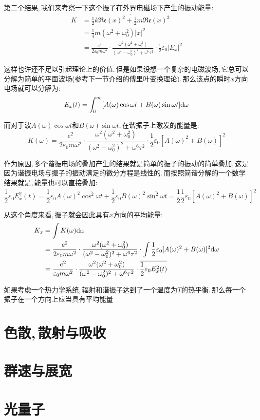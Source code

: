 第二个结果,\,我们来考察一下这个振子在外界电磁场下产生的振动能量:
\begin{align*}
K 	&=\overline{\frac{1}{2}k \mathfrak{Re}(x)^2+\frac{1}{2}m \mathfrak{Re}(\dot{x})^2}\\
	&=\frac{1}{4}m(\omega^2+\omega_0^2)|x|^2\\
	&=\frac{e^2}{2\varepsilon_0 m\omega^2}\cdot \frac{\omega^2(\omega^2+\omega_0^2)}{(\omega^2-\omega_0^2)^2+\omega^6\tau^2}\cdot \frac{1}{2}\varepsilon_0 |E_x|^2
\end{align*}

这样也许还不足以引起理论上的价值.\,但是如果设想一个复杂的电磁波场,\,它总可以分解为简单的平面波场(参考下一节介绍的傅里叶变换理论).\,那么该点的瞬时$x$方向电场就可以分解为:
\[E_x(t)=\int_{0}^{\infty}[A(\omega)\cos{\omega t}+B(\omega)\sin{\omega t}]\textrm{d} \omega\]

而对于波$A(\omega)\cos{\omega t}$和$B(\omega)\sin{\omega t}$,\,在谐振子上激发的能量是:
\[K(\omega)=\frac{e^2}{2\varepsilon_0 m\omega^2}\cdot \frac{\omega^2(\omega^2+\omega_0^2)}{(\omega^2-\omega_0^2)^2+\omega^6\tau^2}\cdot \frac{1}{2}\varepsilon_0 [A(\omega)^2+B(\omega)]^2\]

作为原因,\,多个谐振电场的叠加产生的结果就是简单的振子的振动的简单叠加,\,这是因为谐振电场与振子的振动满足的微分方程是线性的.\,而按照简谐分解的一个数学结果就是,\,能量也可以直接叠加:
\[\overline{\frac{1}{2}\varepsilon_0 E_x^2(t)}=\frac{1}{2}\varepsilon_0 A(\omega)^2\overline{\cos^2\omega t}+ \frac{1}{2}\varepsilon_0B(\omega)^2\overline{\sin^2\omega t}=\frac{1}{2}\frac{1}{2}\varepsilon_0 [A(\omega)^2+B(\omega)]^2\]

从这个角度来看,\,振子就会因此具有$x$方向的平均能量:
\begin{align*}
K_x 	&=\int K(\omega) \textrm{d} \omega \\
		&=\frac{e^2}{2\varepsilon_0 m\omega^2}\cdot \frac{\omega^2(\omega^2+\omega_0^2)}{(\omega^2-\omega_0^2)^2+\omega^6\tau^2}\cdot \int \frac{1}{2}\varepsilon_0 [A(\omega)^2+B(\omega)]^2 \textrm{d} \omega \\
		&=\frac{e^2}{\varepsilon_0 m\omega^2}\cdot \frac{\omega^2(\omega^2+\omega_0^2)}{(\omega^2-\omega_0^2)^2+\omega^6\tau^2}\cdot\overline{\frac{1}{2}\varepsilon_0 E_x^2(t)}
\end{align*}

如果考虑一个热力学系统,\,辐射和谐振子达到了一个温度为$T$的热平衡.\,那么每一个振子在一个方向上应当具有平均能量









\section{色散,\,散射与吸收}

\section{群速与展宽}

\section{光量子}

